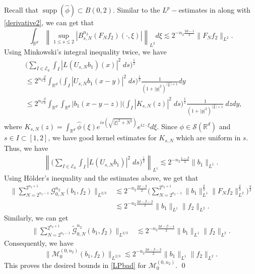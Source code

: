\documentclass[a4paper,reqno]{amsart}
\newcounter{old}
\numberwithin{equation}{section}
\newcommand{\R}{{\mathbb {R}}}
\newcommand{\supp}{\operatorname{supp}}
\begin{document}
	Recall that $\supp(\widehat{\phi})\subset B(0,2)$. Similar to the $L^p-$estimates in  along with \eqref{derivative2}, we can get that
	\[\int_{\mathbb{R}^{d}}\left\| \sup_{1 \leq s\leq 2}\left|B^{n_2}_{s, N}\left(F_{N}f_2\right)(\cdot, \xi)\right|\right\|_{L^2} d \xi\lesssim2^{-n_2\frac{2d-1}{2}}\|F_Nf_2\|_{L^2}.\]
	Using Minkowski's integral inequality twice, we have
	\begin{align*}
		&\bigg(\sum_{I\in \mathcal{E}_0}\int_I\left|L\left(U_{s,N}b_1\right)(x)\right|^2\;ds\bigg)^\frac{1}{2}\\&\leq2^{n_2\frac{\beta}{2}}\int_{\R^d}\bigg(\int_I\left|U_{s,N}b_1(x-y)\right|^2\;ds\bigg)^\frac{1}{2}\frac{1}{\left(1+\left|y\right|^{2}\right)^{\lceil \frac{d}{2}\rceil+1}}dy\\
		&\leq2^{n_2\frac{\beta}{2}}\int_{\R^d}\int_{\R^d}|b_1(x-y-z)|\Big(\int_I\left|K_{s,N}(z)\right|^2\;ds\Big)^\frac{1}{2}\frac{1}{\left(1+\left|y\right|^{2}\right)^{\lceil \frac{d}{2}\rceil+1}}~dzdy,
	\end{align*}
	where $K_{s,N}(z)=\int_{\R^d}\widehat{\phi}\left(\xi\right) e^{is\left(\sqrt{|\xi|^2+N^{2}}\right)}e^{iz\cdot\xi}d\xi$. Since $\phi\in\mathcal{S}(\R^d)$ and $s\in I\subset[1,2]$, we have good kernel estimates for $K_{s,N}$ which are uniform in $s$. Thus, we have
	\begin{align*}
		\left\|\bigg(\sum_{I\in \mathcal{E}_0}\int_I\left|L\left(U_{s,N}b_1\right)\right|^2\;ds\bigg)^\frac{1}{2}\right\|_{L^1}\lesssim2^{-n_2\frac{1-\beta}{2}}\|b_1\|_{L^1}.
	\end{align*}
	Using H\"older's inequality and the estimates above, we get that
	\begin{align*}
		\Bigg\|\sum_{N=2^{n_2-1}}^{2^{n_2+1}}\mathcal{G}^{n_2}_{0,N}(b_1,f_2)\Bigg\|_{L^{2/3}}&\lesssim2^{-n_2\frac{2d-\beta}{2}}\bigg(\sum_{N=2^{n_2-1}}^{2^{n_2+1}}\|b_1\|_{L^1}^{\frac{2}{3}}\|F_Nf_2\|_{L^2}^{\frac{2}{3}}\bigg)^{\frac{3}{2}}\\
		&\lesssim2^{-n_2\frac{2d-\beta-2}{2}}\|b_1\|_{L^1}\|f_2\|_{L^2}.
	\end{align*}
	Similarly, we can get
	\begin{align*}
		\Bigg\|\sum_{N=2^{n_2-1}}^{2^{n_2+1}}\tilde{\mathcal{G}}^{n_2}_{0,N}(b_1,f_2)\Bigg\|_{L^{2/3}}&\lesssim2^{-n_2\frac{2d-\beta-4}{2}}\|b_1\|_{L^1}\|f_2\|_{L^2}.
	\end{align*}
	Consequently, we have
	\[\big\|\mathcal{M}^{(0,n_2)}_0(b_1,f_2)\big\|_{L^{2/3}}\lesssim2^{-n_2\frac{2d-\beta-3}{2}}\|b_1\|_{L^1}\|f_2\|_{L^2}.\]
	This proves the desired bounds in \eqref{LPbad} for $\mathcal{M}^{(0,n_2)}_0$. 	\qed
	
\end{document}
